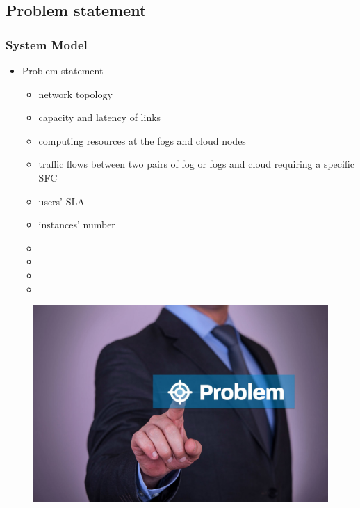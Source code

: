 \documentclass{beamer}
\begin{document}
\subsection{Problem statement}
\begin{frame}
\frametitle{System Model}
\begin{itemize}
	\item  {Problem statement}
\begin{itemize}
	\item {network topology}
	\item  {capacity and latency of links}
	\item  {computing resources at the fogs and cloud nodes}
	\item  {traffic
		flows between two pairs of fog or fogs and cloud requiring a
		specific SFC}
	\item  {users’ SLA}	
	\item  {instances’ number}
	\item  \color{blue}{placement of VNFs}
	\item  \color{blue}{corresponding traffic routing}
	\item \color{blue}{users’
		assignment to the SFC instances}
	\item  \color{red}{minimize overall latency of
		network}
\end{itemize}
\end{itemize}
\begin{figure}	
	\includegraphics[width=0.2\linewidth]{problem_bullseye}
	\label{fig:problembullseye}
\end{figure}
\end{frame}
\end{document}
